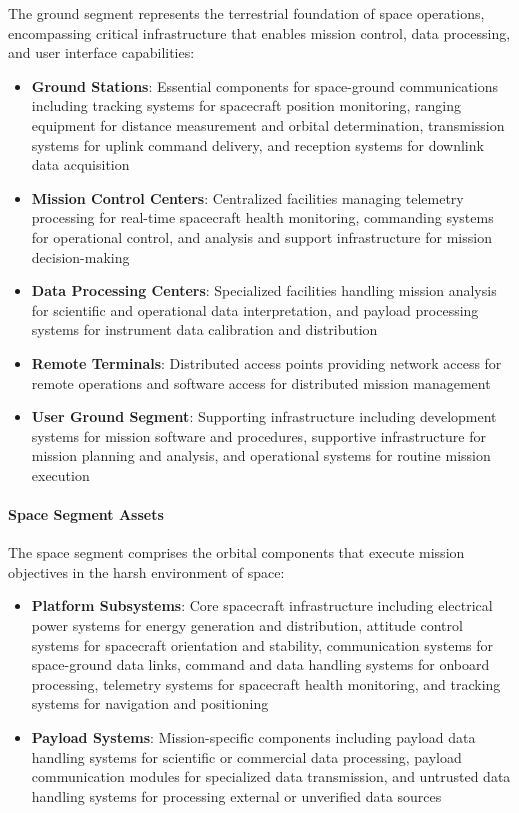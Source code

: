 \documentclass[binding=0.6cm]{sapthesis}
\begin{document}
The ground segment represents the terrestrial foundation of space operations, encompassing critical infrastructure that enables mission control, data processing, and user interface capabilities:

\begin{itemize}
    \item \textbf{Ground Stations}: Essential components for space-ground communications including tracking systems for spacecraft position monitoring, ranging equipment for distance measurement and orbital determination, transmission systems for uplink command delivery, and reception systems for downlink data acquisition
    \item \textbf{Mission Control Centers}: Centralized facilities managing telemetry processing for real-time spacecraft health monitoring, commanding systems for operational control, and analysis and support infrastructure for mission decision-making
    \item \textbf{Data Processing Centers}: Specialized facilities handling mission analysis for scientific and operational data interpretation, and payload processing systems for instrument data calibration and distribution
    \item \textbf{Remote Terminals}: Distributed access points providing network access for remote operations and software access for distributed mission management
    \item \textbf{User Ground Segment}: Supporting infrastructure including development systems for mission software and procedures, supportive infrastructure for mission planning and analysis, and operational systems for routine mission execution
\end{itemize}

\paragraph{Space Segment Assets}

The space segment comprises the orbital components that execute mission objectives in the harsh environment of space:

\begin{itemize}
    \item \textbf{Platform Subsystems}: Core spacecraft infrastructure including electrical power systems for energy generation and distribution, attitude control systems for spacecraft orientation and stability, communication systems for space-ground data links, command and data handling systems for onboard processing, telemetry systems for spacecraft health monitoring, and tracking systems for navigation and positioning
    \item \textbf{Payload Systems}: Mission-specific components including payload data handling systems for scientific or commercial data processing, payload communication modules for specialized data transmission, and untrusted data handling systems for processing external or unverified data sources
\end{itemize}
\end{document}
